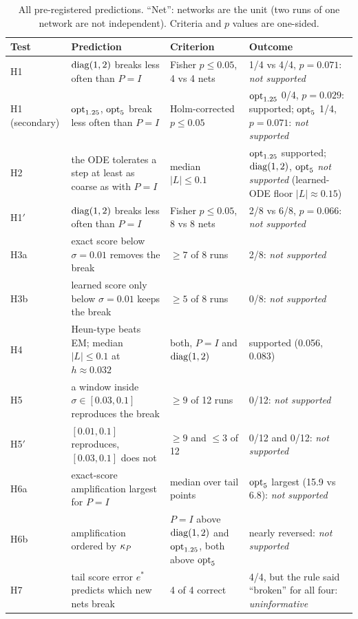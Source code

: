 \begin{table}[t]
\caption{All pre-registered predictions. ``Net'': networks are the unit (two runs of one network are not independent). Criteria and $p$ values are one-sided.}
\label{tab:prereg}
\small
\begin{ruledtabular}
\begin{tabular}{p{}p{}p{}p{}}
Test & Prediction & Criterion & Outcome \\
\hline
H1 & $\mathrm{diag}(1,2)$ breaks less often than $P=I$ & Fisher $p\leq0.05$, 4 vs 4 nets & 1/4 vs 4/4, $p=0.071$: \emph{not supported} \\
H1 (secondary) & $\mathrm{opt}_{1.25}$, $\mathrm{opt}_{5}$ break less often than $P=I$ & Holm-corrected $p\leq0.05$ & $\mathrm{opt}_{1.25}$ 0/4, $p=0.029$: supported; $\mathrm{opt}_{5}$ 1/4, $p=0.071$: \emph{not supported} \\
H2 & the ODE tolerates a step at least as coarse as with $P=I$ & median $|L|\leq0.1$ & $\mathrm{opt}_{1.25}$ supported; $\mathrm{diag}(1,2)$, $\mathrm{opt}_{5}$ \emph{not supported} (learned-ODE floor $|L|\approx0.15$) \\
H1$'$ & $\mathrm{diag}(1,2)$ breaks less often than $P=I$ & Fisher $p\leq0.05$, 8 vs 8 nets & 2/8 vs 6/8, $p=0.066$: \emph{not supported} \\
H3a & exact score below $\sigma=0.01$ removes the break & $\geq7$ of 8 runs & 2/8: \emph{not supported} \\
H3b & learned score only below $\sigma=0.01$ keeps the break & $\geq5$ of 8 runs & 0/8: \emph{not supported} \\
H4 & Heun-type \Sb{} beats EM; median $|L|\leq0.1$ at $h\approx0.032$ & both, $P=I$ and $\mathrm{diag}(1,2)$ & supported (0.056, 0.083) \\
H5 & a window inside $\sigma\in[0.03,0.1]$ reproduces the break & $\geq9$ of 12 runs & 0/12: \emph{not supported} \\
H5$'$ & $[0.01,0.1]$ reproduces, $[0.03,0.1]$ does not & $\geq9$ and $\leq3$ of 12 & 0/12 and 0/12: \emph{not supported} \\
H6a & exact-score amplification largest for $P=I$ & median over tail points & $\mathrm{opt}_{5}$ largest (15.9 vs 6.8): \emph{not supported} \\
H6b & amplification ordered by $\kappa_P$ & $P=I$ above $\mathrm{diag}(1,2)$ and $\mathrm{opt}_{1.25}$, both above $\mathrm{opt}_{5}$ & nearly reversed: \emph{not supported} \\
H7 & tail score error $e^\ast$ predicts which new nets break & 4 of 4 correct & 4/4, but the rule said ``broken'' for all four: \emph{uninformative} \\

\end{tabular}
\end{ruledtabular}
\end{table}
